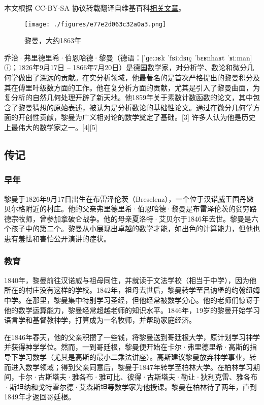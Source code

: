 
本文根据 CC-BY-SA 协议转载翻译自维基百科\href{https://en.wikipedia.org/wiki/Bernhard_Riemann}{相关文章}。

\begin{figure}[ht]
\centering
\texttt{[image: ./figures/e77e2d063c32a0a3.png]}
\caption{黎曼，大约1863年} \label{fig_BEHDLM_1}
\end{figure}
乔治·弗里德里希·伯恩哈德·黎曼（德语：[ˈɡeːɔʁk ˈfʁiːdʁɪç ˈbɛʁnhaʁt ˈʁiːman] ⓘ；1826年9月17日 – 1866年7月20日）是德国数学家，对分析学、数论和微分几何学做出了深远的贡献。在实分析领域，他最著名的是首次严格提出的黎曼积分及其在傅里叶级数方面的工作。他在复分析方面的贡献，尤其是引入了黎曼曲面，为复分析的自然几何处理开辟了新天地。他1859年关于素数计数函数的论文，其中包含了黎曼猜想的原始表述，被认为是分析数论的基础性论文。通过在微分几何学方面的开创性贡献，黎曼为广义相对论的数学奠定了基础。[3] 许多人认为他是历史上最伟大的数学家之一。[4][5]
\subsection{传记}  
\subsubsection{早年}  
黎曼于1826年9月17日出生在布雷泽伦茨（Breselenz），一个位于汉诺威王国丹嫩贝尔格附近的村庄。他的父亲弗里德里希·伯恩哈德·黎曼是布雷泽伦茨的贫穷路德宗牧师，曾参加拿破仑战争。他的母亲夏洛特·艾贝尔于1846年去世。黎曼是六个孩子中的第二个。黎曼从小展现出卓越的数学才能，如出色的计算能力，但他也患有羞怯和害怕公开演讲的症状。
\subsubsection{教育}  
1840年，黎曼前往汉诺威与祖母同住，并就读于文法学校（相当于中学），因为他所在的村庄没有这样的学校。1842年，祖母去世后，黎曼转学至吕讷堡的约翰纽姆中学。在那里，黎曼集中特别学习圣经，但他经常被数学分心。他的老师们惊讶于他的数学运算能力，黎曼经常超越老师的知识水平。1846年，19岁的黎曼开始学习语言学和基督教神学，打算成为一名牧师，并帮助家庭经济。

在1846年春天，他的父亲积攒了一些钱，将黎曼送到哥廷根大学，原计划学习神学并获得神学学位。然而，一到哥廷根，黎曼便开始在卡尔·弗里德里希·高斯的指导下学习数学（尤其是高斯的最小二乘法讲座）。高斯建议黎曼放弃神学事业，转而进入数学领域；得到父亲同意后，黎曼于1847年转学至柏林大学。在柏林学习期间，卡尔·古斯塔夫·雅各布·雅可比、彼得·古斯塔夫·勒让·狄利克雷、雅各布·斯坦纳和戈特霍尔德·艾森斯坦等数学家为他授课。黎曼在柏林待了两年，直到1849年才返回哥廷根。
